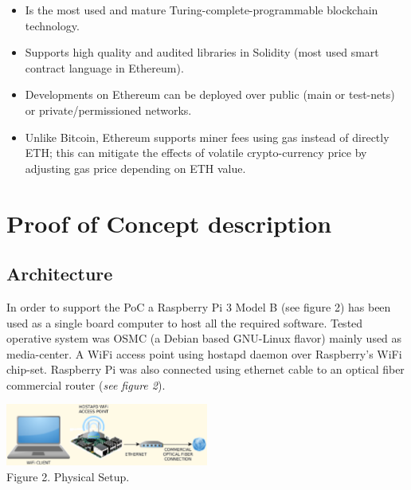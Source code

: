 \documentclass[12pt]{amsart}
\begin{document}
\begin{multicols}{2}
\begin{itemize}
\item Is the most used and mature
Turing-complete-programmable blockchain technology.
\item Supports high quality and audited
libraries in Solidity (most used smart contract language in Ethereum).
\item Developments on Ethereum can be deployed
over public (main or test-nets) or private/permissioned networks.
\item Unlike Bitcoin, Ethereum supports miner fees using gas
instead of directly ETH; this can mitigate the effects of
volatile crypto-currency price by adjusting gas price depending
on ETH value.
\end{itemize}


\section{Proof of Concept description}

\subsection{Architecture}
\label{ch:architecture}
\vspace{0.35cm}

In order to support the PoC a
Raspberry Pi 3 Model B (see figure 2) has been used
as a single board computer to host all the required software.
Tested operative system was OSMC\cite{osmc} (a Debian based
GNU-Linux flavor) mainly used as media-center.
A WiFi access point using
hostapd\cite{hostapd} daemon over Raspberry's WiFi chip-set.
Raspberry Pi was also connected using ethernet cable
to an optical fiber commercial router (\textit{see figure 2}).

\begin{center}
  \includegraphics[keepaspectratio, width=0.5\textwidth]{images/physical-setup-y.eps}
\\
Figure 2. Physical Setup.
\\


\end{center}
\end{multicols}
\end{document}
